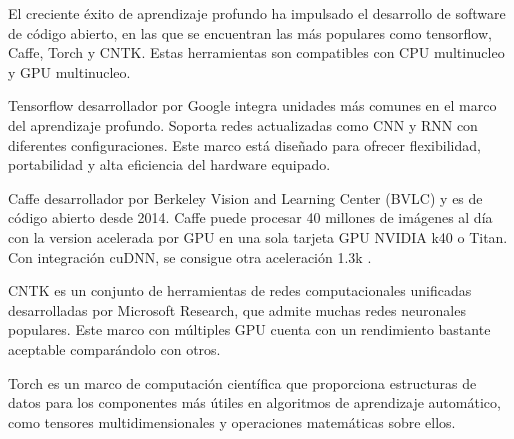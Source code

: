 El creciente éxito de aprendizaje profundo ha impulsado el desarrollo de software de código abierto, en las que se encuentran las más populares como tensorflow, Caffe, Torch y CNTK. Estas herramientas son compatibles con CPU multinucleo y GPU multinucleo\citep{shi2016benchmarking,liu2020application}.

Tensorflow desarrollador por Google integra unidades más comunes en el marco del aprendizaje profundo. Soporta redes actualizadas como CNN y RNN con diferentes configuraciones. Este marco está diseñado para ofrecer flexibilidad, portabilidad y alta eficiencia del hardware equipado.

Caffe desarrollador por Berkeley Vision and Learning Center (BVLC) y es de código abierto desde 2014. Caffe puede procesar 40 millones de imágenes al día con la version acelerada por GPU en una sola tarjeta GPU NVIDIA k40 o Titan. Con integración cuDNN, se consigue otra aceleración 1.3k \citep{chetlur2014cudnn}.

CNTK es un conjunto de herramientas de redes computacionales unificadas desarrolladas por Microsoft Research, que admite muchas redes neuronales populares. Este marco con múltiples GPU cuenta con un rendimiento bastante aceptable comparándolo con otros\citep{huang2015microsoft}.

Torch es un marco de computación científica que proporciona estructuras de datos para los componentes más útiles en algoritmos de aprendizaje automático, como tensores multidimensionales y operaciones matemáticas sobre ellos.


